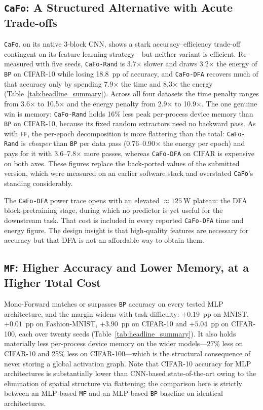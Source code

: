 \documentclass{llncs}
\newcommand{\FF}{\texttt{FF}}
\newcommand{\MF}{\texttt{MF}}
\newcommand{\BP}{\texttt{BP}}
\newcommand{\CaFo}{\texttt{CaFo}}
\newcommand{\CaFoRand}{\texttt{CaFo-Rand}}
\newcommand{\CaFoDFA}{\texttt{CaFo-DFA}}
\begin{document}
\subsection{\CaFo{}: A Structured Alternative with Acute Trade-offs}

\CaFo{}, on its native 3-block CNN, shows a stark accuracy--efficiency
trade-off contingent on its feature-learning strategy---but neither variant is
efficient. Re-measured with five seeds, \CaFoRand{} is \num{3.7}$\times$
slower and draws \num{3.2}$\times$ the energy of \BP{} on CIFAR-10 while
losing \num{18.8}~pp of accuracy, and \CaFoDFA{} recovers much of that
accuracy only by spending \num{7.9}$\times$ the time and \num{8.3}$\times$ the
energy (Table~\ref{tab:headline_summary}). Across all four datasets the
time penalty ranges from \num{3.6}$\times$ to \num{10.5}$\times$ and the
energy penalty from \num{2.9}$\times$ to \num{10.9}$\times$. The one genuine
win is memory: \CaFoRand{} holds \num{16}\% less peak per-process device
memory than \BP{} on CIFAR-10, because its fixed random extractors need no
backward pass. As with \FF{}, the per-epoch decomposition is more flattering
than the total: \CaFoRand{} is \emph{cheaper} than \BP{} per data pass
(\numrange{0.76}{0.90}$\times$ the energy per epoch) and pays for it with
\numrange{3.6}{7.8}$\times$ more passes, whereas \CaFoDFA{} on CIFAR is
expensive on both axes. These figures replace the back-ported values of the
submitted version, which were measured on an earlier software stack and
overstated \CaFo{}'s standing considerably.


The \CaFoDFA{} power trace opens with an elevated
${\approx}\SI{125}{\watt}$ plateau: the DFA block-pretraining stage, during
which no predictor is yet useful for the downstream task. That cost is
included in every reported \CaFoDFA{} time and energy figure. The design
insight is that high-quality features are necessary for accuracy but that DFA
is not an affordable way to obtain them.

\subsection{\MF{}: Higher Accuracy and Lower Memory, at a Higher Total
Cost}

Mono-Forward matches or surpasses \BP{} accuracy on every tested MLP
architecture, and the margin widens with task difficulty: $+\num{0.19}$~pp
on MNIST, $+\num{0.01}$~pp on Fashion-MNIST, $+\num{3.90}$~pp on CIFAR-10
and $+\num{5.04}$~pp on CIFAR-100, each over twenty seeds
(Table~\ref{tab:headline_summary}). It also holds materially less
per-process device memory on the wider models---\num{27}\% less on
CIFAR-10 and \num{25}\% less on CIFAR-100---which is the structural
consequence of never storing a global activation graph.
Note that CIFAR-10 accuracy for MLP architectures is substantially lower
than CNN-based state-of-the-art owing to the elimination of spatial
structure via flattening; the comparison here is strictly between an
MLP-based \MF{} and an MLP-based \BP{} baseline on identical architectures.
\end{document}
